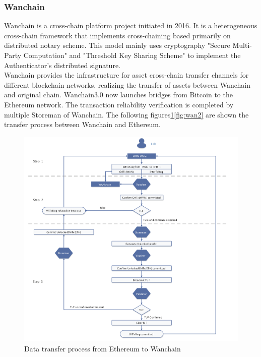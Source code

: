 \subsubsection{Wanchain}
\noindent Wanchain\cite{wanchain.org} is a cross-chain platform project initiated in 2016. It is a heterogeneous cross-chain framework that implements cross-chaining based primarily on distributed notary scheme. This model mainly uses cryptography "Secure Multi-Party Computation" and "Threshold Key Sharing Scheme" to implement the Authenticator's distributed signature.\\
\noindent Wanchain provides the infrastructure for asset cross-chain transfer channels for different blockchain networks, realizing the transfer of assets between Wanchain and original chain. Wanchain3.0 now launches bridges from Bitcoin to the Ethereum network. The transaction reliability verification is completed by multiple Storeman of Wanchain. The following figures\ref{fig:wan1}\ref{fig:wan2} are shown the transfer process between Wanchain and Ethereum.
        \begin{figure}[H]
        \includegraphics[width=1\textwidth]{./figures/ethtowan.png}
        \centering
        \caption{{Data transfer process from Ethereum to Wanchain}\protect\footnotemark}
        \centering
        \label{fig:wan1}
        
        \end{figure}
